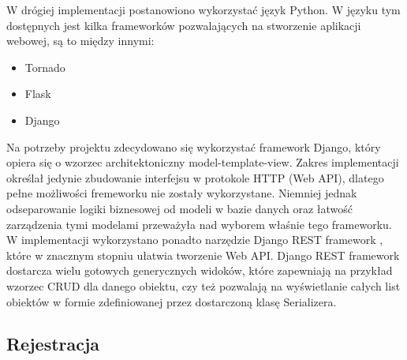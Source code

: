 \documentclass[12pt, notitlepage]{article}
\begin{document}
W drógiej implementacji postanowiono wykorzystać język Python. W języku tym dostępnych jest kilka frameworków pozwalających na stworzenie aplikacji webowej, są to między innymi:
\begin{itemize}
    \item Tornado
    \item Flask
    \item Django
\end{itemize}

Na potrzeby projektu zdecydowano się wykorzystać framework Django, który opiera się o wzorzec architektoniczny model-template-view. Zakres implementacji określał jedynie zbudowanie interfejsu w protokole HTTP (Web API), dlatego pełne możliwości fremeworku nie zostały wykorzystane. Niemniej jednak odseparowanie logiki biznesowej od modeli w bazie danych oraz łatwość zarządzenia tymi modelami przeważyła nad wyborem właśnie tego frameworku. W implementacji wykorzystano ponadto narzędzie Django REST framework \cite{django_rest_framework}, które w znacznym stopniu ułatwia tworzenie Web API. Django REST framework dostarcza wielu gotowych generycznych widoków, które zapewniają na przykład wzorzec CRUD dla danego obiektu, czy też pozwalają na wyświetlanie całych list obiektów w formie zdefiniowanej przez dostarczoną klasę Serializera.

\subsection{Rejestracja} \label{sec:rejestracja}
\end{document}
